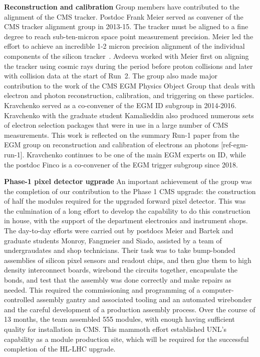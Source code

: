 {\bf Reconstruction and calibration}
Group members have contributed to the alignment of the CMS tracker.  Postdoc Frank Meier served as convener of the CMS tracker alignment group in 2013-15.  The tracker must be aligned to a fine degree to reach sub-ten-micron space point measurement precision.  Meier led the effort to achieve an incredible 1-2 micron precision alignment of the individual components of the silicon tracker~\cite{bib:alignment}.  Avdeeva worked with Meier first on aligning the tracker using cosmic rays during the period before proton collisions and later with collision data at the start of Run~2. The group also made major contribution to the work of the CMS EGM Physics Object Group that deals with electron and photon reconstruction, calibration, and triggering on these particles. Kravchenko served as a co-convener of the EGM ID subgroup in 2014-2016. Kravchenko with the graduate student Kamalieddin also produced numerous sets of electron selection packages that were in use in a large number of CMS measurements. This work is reflected on the summary Run-1 paper from the EGM group on reconstruction and calibration of electrons an photons [ref-egm-run-1]. Kravchenko continues to be one of the main EGM experts on ID, while the postdoc Finco is a co-convener of the EGM trigger subgroup since 2018.

{\bf Phase-1 pixel detector ugprade}
An important achievement of the group was the completion of our contribution to the Phase 1 CMS upgrade: the construction of half the modules required for the upgraded forward pixel detector.  This was the culmination of a long effort to develop the capability to do this construction in house, with the support of the department electronics and instrument shops.  The day-to-day efforts were carried out by postdocs Meier and Bartek and graduate students Monroy, Fangmeier and Siado, assisted by a team of undergraudates and shop technicians.  Their task was to take bump-bonded assemblies of silicon pixel sensors and readout chips, and then glue them to high density interconnect boards, wirebond the circuits together, encapsulate the bonds, and test that the assembly was done correctly and make repairs as needed.  This required the commissioning and programming of a computer-controlled assembly gantry and associated tooling and an automated wirebonder and the careful development of a production assembly process.  Over the course of 13 months, the team assembled 555 modules, with enough having sufficient quality for installation in CMS.  This mammoth effort established UNL's capability as a module production site, which will be required for the successful completion of the HL-LHC upgrade.

